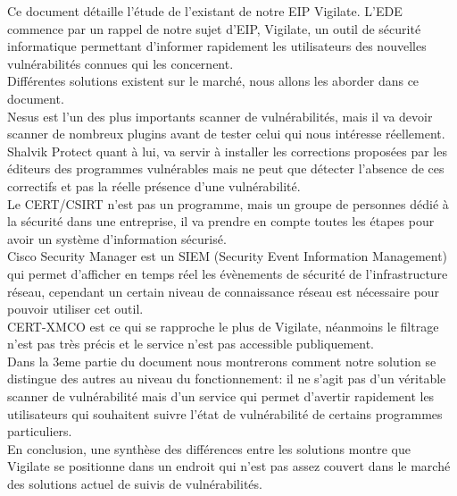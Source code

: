 Ce document détaille l'étude de l'existant de notre EIP Vigilate. L'EDE commence par un rappel de notre sujet d'EIP, Vigilate, un outil de sécurité informatique permettant d'informer rapidement les utilisateurs des nouvelles vulnérabilités connues qui les concernent.\\
Différentes solutions existent sur le marché, nous allons les aborder dans ce document.\\
Nesus est l’un des plus importants scanner de vulnérabilités, mais il va devoir scanner de nombreux plugins avant de tester celui qui nous intéresse réellement.\\
Shalvik Protect quant à lui, va servir à installer les corrections proposées par les éditeurs des programmes vulnérables mais ne peut que détecter l’absence de ces correctifs et pas la réelle présence d’une vulnérabilité.\\
Le CERT/CSIRT n’est pas un programme, mais un groupe de personnes dédié à la sécurité dans une entreprise, il va prendre en compte toutes les étapes pour avoir un système d’information sécurisé.\\
Cisco Security Manager est un SIEM (Security Event Information Management) qui permet d’afficher en temps réel les évènements de sécurité de l'infrastructure réseau, cependant un certain niveau de connaissance réseau est nécessaire pour pouvoir utiliser cet outil.\\
CERT-XMCO est ce qui se rapproche le plus de Vigilate, néanmoins le filtrage n’est pas très précis et le service n’est pas accessible publiquement.\\
Dans la 3eme partie du document nous montrerons comment notre solution se distingue des autres au niveau du fonctionnement: il ne s’agit pas d’un véritable scanner de vulnérabilité mais d’un service qui permet d’avertir rapidement les utilisateurs qui souhaitent suivre l’état de vulnérabilité de certains programmes particuliers.\\
En conclusion, une synthèse des différences entre les solutions montre que Vigilate se positionne dans un endroit qui n’est pas assez couvert dans le marché des solutions actuel de suivis de vulnérabilités.\\